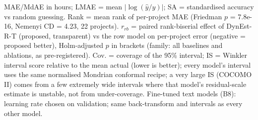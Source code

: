 \begin{table}[t]
\begin{tabular}{lrrrrrrrrr}
\bottomrule
\end{tabular}
\par\smallskip\parbox{0.95\linewidth}{\footnotesize MAE/MdAE in hours; LMAE = mean $|\log(\hat y/y)|$; SA = standardised accuracy vs random guessing. Rank = mean rank of per-project MAE (Friedman $p$ = 7.8e-16, Nemenyi CD = 4.23, 22 projects). $r_{rb}$ = paired rank-biserial effect of DynEst-R-T (proposed, transparent) vs the row model on per-project error (negative = proposed better), Holm-adjusted $p$ in brackets (family: all baselines and ablations, as pre-registered). Cov. = coverage of the 95\% interval; IS = Winkler interval score relative to the mean actual (lower is better); every model's interval uses the same normalised Mondrian conformal recipe; a very large IS (COCOMO II) comes from a few extremely wide intervals where that model's residual-scale estimate is unstable, not from under-coverage. Fine-tuned text models (B8): learning rate chosen on validation; same back-transform and intervals as every other model.}
\end{table}
